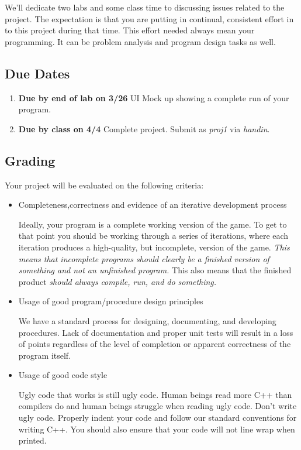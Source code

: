 \documentclass[]{tufte-handout}
\begin{document}
We'll dedicate two labs and some class time to discussing issues related to the project.  The expectation is that you are putting in continual, consistent effort in to this project during that time. This effort needed always mean your programming. It can be problem analysis and program design tasks as well. 

\subsection{Due Dates}
\begin{enumerate}
\item \textbf{Due by end of lab on 3/26} UI Mock up showing a complete run of your program.
\item \textbf{Due by class on 4/4} Complete project. Submit as \textit{proj1} via \textit{handin}.
\end{enumerate}

\subsection{Grading}

Your project will be evaluated on the following criteria:
\begin{itemize}
\item Completeness,correctness and evidence of an iterative development process

Ideally, your program is a complete working version of the game. To get to that point you should be working through a series of iterations, where each iteration produces a high-quality, but incomplete, version of the game.  \textit{This means that incomplete programs should clearly be a finished version of something and not an unfinished program.} This also means that the finished product \textit{should always compile, run, and do something.} 

\item Usage of good program/procedure design principles

We have a standard process for designing, documenting, and developing procedures. Lack of documentation and proper unit tests will result in a loss of points regardless of the level of completion or apparent correctness of the program itself.

\item Usage of good code style

Ugly code that works is still ugly code. Human beings read more C++ than compilers do and human beings struggle when reading ugly code. Don't write ugly code.  Properly indent your code and follow our standard conventions for writing C++.  You should also ensure that your code will not line wrap when printed.
\end{itemize}
\end{document}
